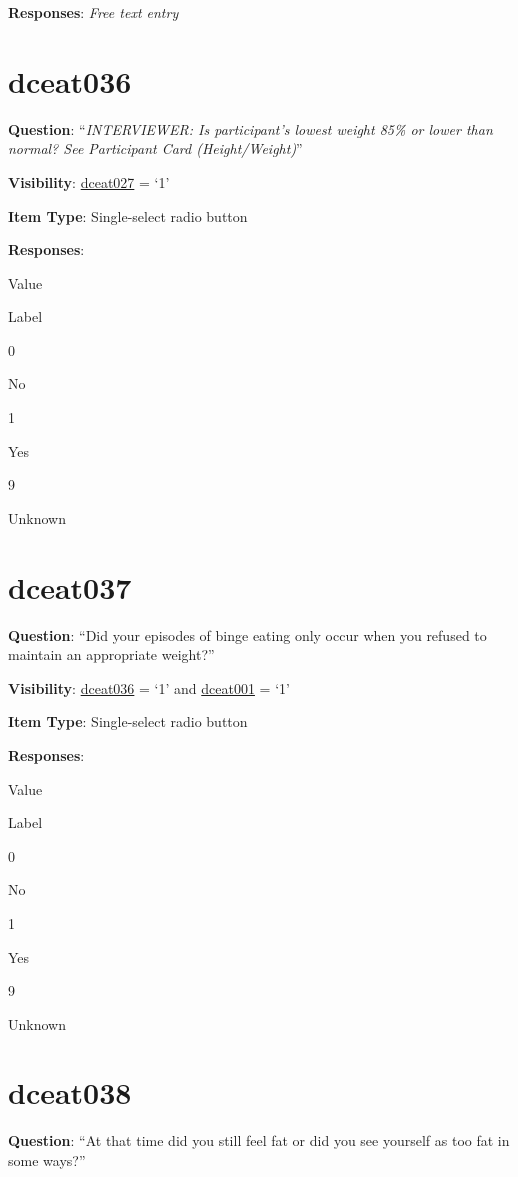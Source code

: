 \documentclass[]{book}
\begin{document}
\textbf{Responses}: \emph{Free text entry}

\hypertarget{dceat036}{%
\section{dceat036}\label{dceat036}}

\textbf{Question}: ``\emph{INTERVIEWER: Is participant's lowest weight 85\% or lower than normal? See Participant Card (Height/Weight)}''

\textbf{Visibility}: \protect\hyperlink{dceat027}{dceat027} = `1'

\textbf{Item Type}: Single-select radio button

\textbf{Responses}:

Value

Label

0

No

1

Yes

9

Unknown

\hypertarget{dceat037}{%
\section{dceat037}\label{dceat037}}

\textbf{Question}: ``Did your episodes of binge eating only occur when you refused to maintain an appropriate weight?''

\textbf{Visibility}: \protect\hyperlink{dceat036}{dceat036} = `1' and \protect\hyperlink{dceat001}{dceat001} = `1'

\textbf{Item Type}: Single-select radio button

\textbf{Responses}:

Value

Label

0

No

1

Yes

9

Unknown

\hypertarget{dceat038}{%
\section{dceat038}\label{dceat038}}

\textbf{Question}: ``At that time did you still feel fat or did you see yourself as too fat in some ways?''
\end{document}
